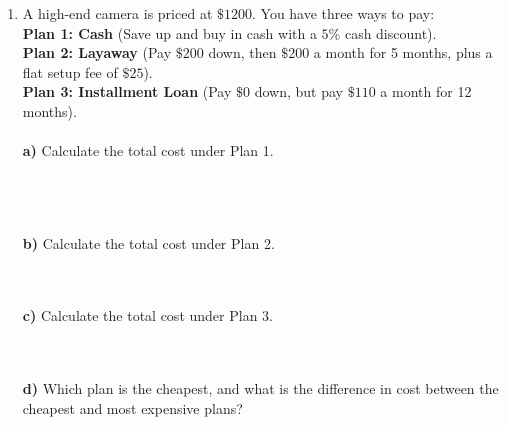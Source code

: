 \documentclass[12pt, letterpaper, fleqn]{article}
\begin{document}
\begin{enumerate}[itemsep=2.5cm, leftmargin=0.6cm]
\item A high-end camera is priced at $\$1200$. You have three ways to pay: \\
\textbf{Plan 1: Cash} (Save up and buy in cash with a $5\%$ cash discount). \\
\textbf{Plan 2: Layaway} (Pay $\$200$ down, then $\$200$ a month for 5 months, plus a flat setup fee of $\$25$). \\
\textbf{Plan 3: Installment Loan} (Pay $\$0$ down, but pay $\$110$ a month for 12 months). \\ \\
\textbf{a)} Calculate the total cost under Plan 1. \\ \\
 \\ \\
\vspace{1cm}

\textbf{b)} Calculate the total cost under Plan 2. \\ \\
 \\
\vspace{1cm}

\textbf{c)} Calculate the total cost under Plan 3. \\ \\
 \\
\vspace{1cm}

\textbf{d)} Which plan is the cheapest, and what is the difference in cost between the cheapest and most expensive plans? \\ \\

\end{enumerate}
\end{document}
